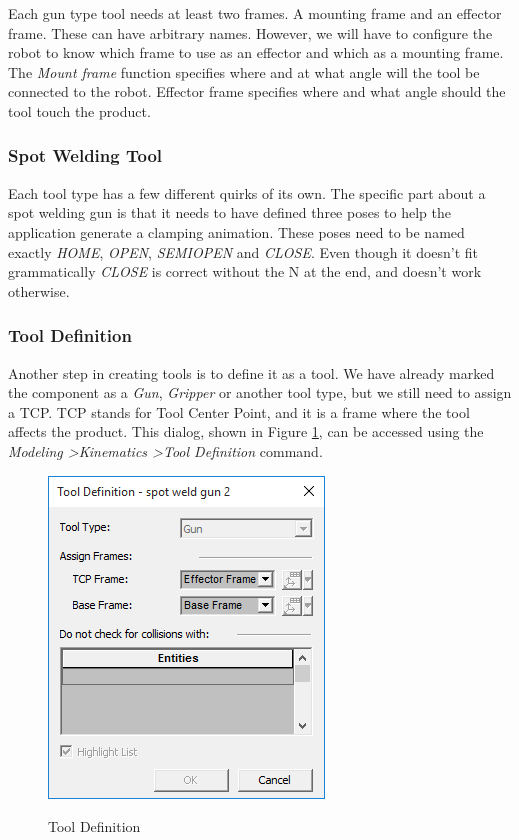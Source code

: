 Each gun type tool needs at least two frames. 
A mounting frame and an effector frame.
These can have arbitrary names. 
However, we will have to configure the robot to know which frame to use as an effector and which as a mounting frame.
The \emph{Mount frame} function specifies where and at what angle will the tool be connected to the robot.
Effector frame specifies where and what angle should the tool touch the product. \\

\subsubsection{Spot Welding Tool}
Each tool type has a few different quirks of its own.
The specific part about a spot welding gun is that it needs to have defined three poses to help the application generate a clamping animation.
These poses need to be named exactly \emph{HOME}, \emph{OPEN}, \emph{SEMIOPEN} and \emph{CLOSE}.
Even though it doesn't fit grammatically \emph{CLOSE} is correct without the N at the end, and doesn't work otherwise. \\

\subsubsection{Tool Definition}
Another step in creating tools is to define it as a tool.
We have already marked the component as a \emph{Gun}, \emph{Gripper} or another tool type, but we still need to assign a TCP. 
TCP stands for Tool Center Point, and it is a frame where the tool affects the product.
This dialog, shown in Figure \ref{fig:ToolDefinition}, can be accessed using the \emph{Modeling \textgreater Kinematics \textgreater Tool Definition} command. \\

\begin{figure}[H]
    \caption{Tool Definition}
    \centering
    \includegraphics{tool_definition}
    \label{fig:ToolDefinition}
\end{figure}

